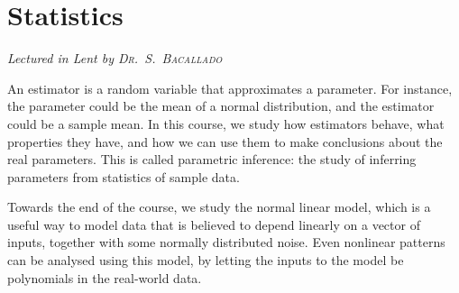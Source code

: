 \chapter[Statistics \\ \textnormal{\emph{Lectured in Lent \oldstylenums{2022} by \textsc{Dr.\ S.\ Bacallado}}}]{Statistics}
\emph{\Large Lectured in Lent  by \textsc{Dr.\ S.\ Bacallado}}

An estimator is a random variable that approximates a parameter.
For instance, the parameter could be the mean of a normal distribution, and the estimator could be a sample mean.
In this course, we study how estimators behave, what properties they have, and how we can use them to make conclusions about the real parameters.
This is called parametric inference: the study of inferring parameters from statistics of sample data.

Towards the end of the course, we study the normal linear model, which is a useful way to model data that is believed to depend linearly on a vector of inputs, together with some normally distributed noise.
Even nonlinear patterns can be analysed using this model, by letting the inputs to the model be polynomials in the real-world data.


